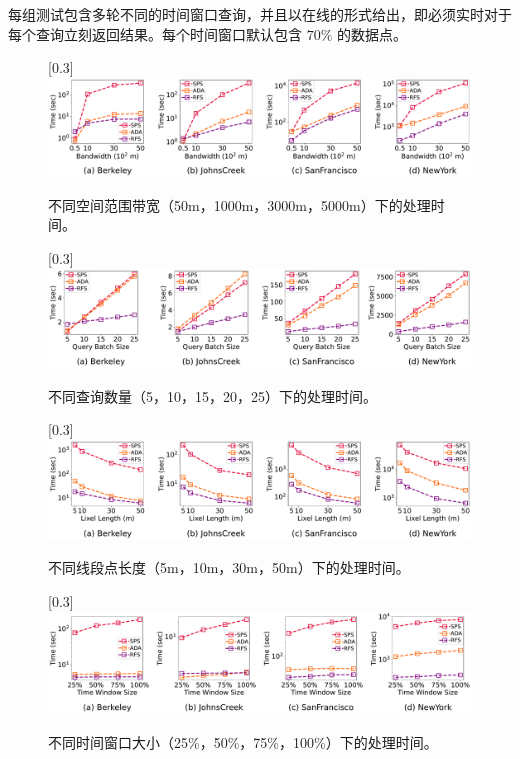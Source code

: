每组测试包含多轮不同的时间窗口查询，并且以在线的形式给出，即必须实时对于每个查询立刻返回结果。每个时间窗口默认包含 $70\%$ 的数据点。

\begin{figure}[p!]\centering
	\hspace{-8pt}
	\scalebox{0.3}[0.3]{\includegraphics{./figures/EXP_Bandwidth_R.pdf}}
	\vspace{-8pt}
	\caption{不同空间范围带宽（50m，1000m，3000m，5000m）下的处理时间。}
	\label{exp1.1}
	
	\vspace{10pt}
	\scalebox{0.3}[0.3]{\includegraphics{./figures/EXP_Bandwidth_W.pdf}}
	\vspace{-8pt}
	\caption{不同查询数量（5，10，15，20，25）下的处理时间。}
	\label{exp1.2}
	
	\vspace{10pt}
	\scalebox{0.3}[0.3]{\includegraphics{./figures/EXP_Bandwidth_L.pdf}}
	\vspace{-8pt}
	\caption{不同线段点长度（5m，10m，30m，50m）下的处理时间。}
	\label{exp1.3}
	
	\vspace{10pt}
	\scalebox{0.3}[0.3]{\includegraphics{./figures/EXP_Bandwidth_P.pdf}}
	\vspace{-8pt}
	\caption{不同时间窗口大小（25\%，50\%，75\%，100\%）下的处理时间。}
	\label{exp1.4}
\end{figure}


